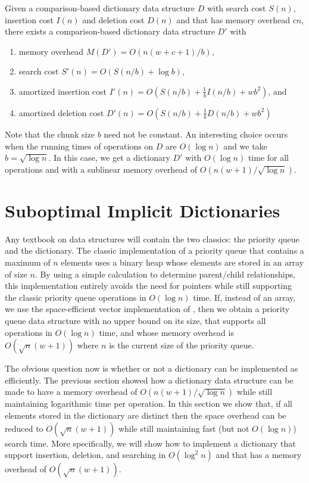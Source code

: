 \begin{thm}
Given a comparison-based dictionary data structure $D$ with search cost
$S(n)$, insertion cost $I(n)$ and deletion cost $D(n)$ and that has
memory overhead $cn$, there exists a comparison-based dictionary data 
structure $D'$ with
\begin{enumerate}
\item memory overhead $M(D')=O(n(w+c+1)/b)$,
\item search cost $S'(n)=O(S(n/b) + \log b)$,
\item amortized insertion cost $I'(n)=O(S(n/b) + \frac{1}{b}I(n/b) + wb^2)$, and
\item amortized deletion cost $D'(n)=O(S(n/b) + \frac{1}{b}D(n/b) + wb^2)$
\end{enumerate}
\end{thm}

Note that the chunk size $b$ need not be constant.  An interesting
choice occurs when the running times of operations on $D$ are $O(\log n)$
and we take $b=\sqrt{\log n}$.  In this case, we get a dictionary $D'$
with $O(\log n)$ time for all operations and with a sublinear memory
overhead of $O(n(w+1)/\sqrt{\log n})$.

\section{Suboptimal Implicit Dictionaries}

Any textbook on data structures will contain the two classics:  the
priority queue and the dictionary.  The classic implementation of a
priority queue that contains a maximum of $n$ elements uses a binary heap
whose elements are stored in an array of size $n$.  By using a simple
calculation to determine parent/child relationships, this implementation
entirely avoids the need for pointers while still supporting the classic
priority queue operations in $O(\log n)$ time.  If, instead of an array, we
use the space-efficient vector implementation of , then we
obtain a priority queue data structure with no upper bound on its size,
that supports all operations in $O(\log n)$ time, and whose memory overhead
is $O(\sqrt{n}(w+1))$ where $n$ is the current size of the priority queue.

The obvious question now is whether or not a dictionary can be implemented
as efficiently.  The previous section showed how a dictionary data
structure can be made to have a memory overhead of $O(n(w+1)/\sqrt{\log
n})$ while still maintaining logarithmic time per operation.  In this
section we show that, if all elements stored in the dictionary are distinct
then the space overhead can be reduced to $O(\sqrt{n}(w+1))$ while still
maintaining fast (but not $O(\log n)$) search time.  More specifically, we
will show how to implement a dictionary that support insertion, deletion,
and searching in $O(\log^2 n)$ and that has a memory overhead of
$O(\sqrt{n}(w+1))$.

